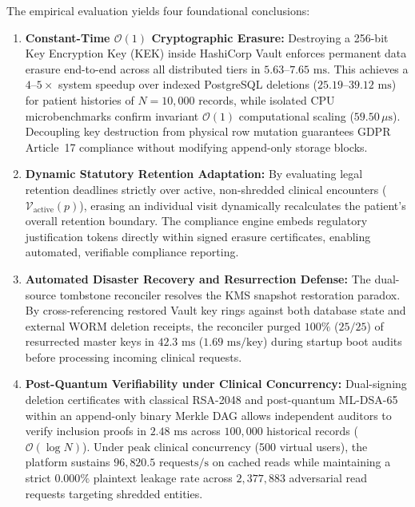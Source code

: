 The empirical evaluation yields four foundational conclusions:
\begin{enumerate}
    \item \textbf{Constant-Time $\mathcal{O}(1)$ Cryptographic Erasure:} Destroying a 256-bit Key Encryption Key (KEK) inside HashiCorp Vault enforces permanent data erasure end-to-end across all distributed tiers in $5.63\text{--}7.65\text{~ms}$. This achieves a $4\text{--}5\times$ system speedup over indexed PostgreSQL deletions ($25.19\text{--}39.12\text{~ms}$) for patient histories of $N = 10{,}000$ records, while isolated CPU microbenchmarks confirm invariant $\mathcal{O}(1)$ computational scaling ($59.50\,\mu\text{s}$). Decoupling key destruction from physical row mutation guarantees GDPR Article~17 compliance without modifying append-only storage blocks.

    \item \textbf{Dynamic Statutory Retention Adaptation:} By evaluating legal retention deadlines strictly over active, non-shredded clinical encounters ($\mathcal{V}_{\text{active}}(p)$), erasing an individual visit dynamically recalculates the patient's overall retention boundary. The compliance engine embeds regulatory justification tokens directly within signed erasure certificates, enabling automated, verifiable compliance reporting.

    \item \textbf{Automated Disaster Recovery and Resurrection Defense:} The dual-source tombstone reconciler resolves the KMS snapshot restoration paradox. By cross-referencing restored Vault key rings against both database state and external WORM deletion receipts, the reconciler purged $100\%$ ($25/25$) of resurrected master keys in $42.3\text{~ms}$ ($1.69\text{~ms/key}$) during startup boot audits before processing incoming clinical requests.

    \item \textbf{Post-Quantum Verifiability under Clinical Concurrency:} Dual-signing deletion certificates with classical RSA-2048 and post-quantum ML-DSA-65 within an append-only binary Merkle DAG allows independent auditors to verify inclusion proofs in $2.48\text{~ms}$ across $100{,}000$ historical records ($\mathcal{O}(\log N)$). Under peak clinical concurrency (500 virtual users), the platform sustains $96{,}820.5\text{~requests/s}$ on cached reads while maintaining a strict $0.000\%$ plaintext leakage rate across $2{,}377{,}883$ adversarial read requests targeting shredded entities.
\end{enumerate}

